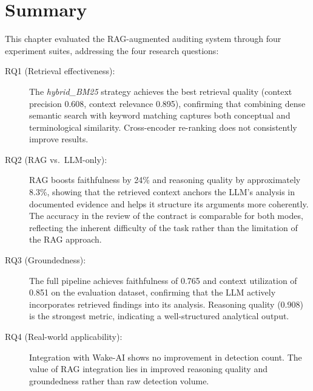 


\section{Summary}
\label{sec:eval-summary}

This chapter evaluated the RAG-augmented auditing system through four experiment suites, addressing the four research questions:

\begin{description}
    \item[RQ1 (Retrieval effectiveness):] The \emph{hybrid\_BM25} strategy achieves the best retrieval quality (context precision 0.608, context relevance 0.895), confirming that combining dense semantic search with keyword matching captures both conceptual and terminological similarity. Cross-encoder re-ranking does not consistently improve results.

    \item[RQ2 (RAG vs.\ LLM-only):] RAG boosts faithfulness by 24\% and reasoning quality by approximately 8.3\%, showing that the retrieved context anchors the LLM's analysis in documented evidence and helps it structure its arguments more coherently. The accuracy in the review of the contract is comparable for both modes, reflecting the inherent difficulty of the task rather than the limitation of the RAG approach.

    \item[RQ3 (Groundedness):] The full pipeline achieves faithfulness of 0.765 and context utilization of 0.851 on the evaluation dataset, confirming that the LLM actively incorporates retrieved findings into its analysis. Reasoning quality (0.908) is the strongest metric, indicating a well-structured analytical output.

    \item[RQ4 (Real-world applicability):] Integration with Wake-AI shows no improvement in detection count. The value of RAG integration lies in improved reasoning quality and groundedness rather than raw detection volume.
\end{description}

